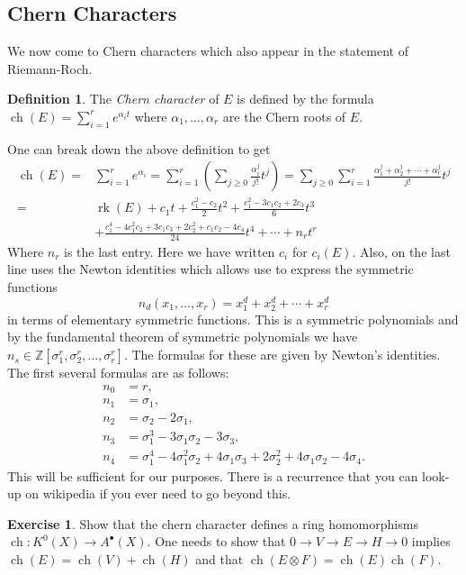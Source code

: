 \documentclass[12pt]{article}
\numberwithin{equation}{section}
\theoremstyle{definition}
\newtheorem{definition}[theorem]{Definition}
\newtheorem{exercise}[theorem]{Exercise}
\theoremstyle{remark}
\newcommand{\ZZ}{\mathbb{Z}}
\newcommand{\rk}{\operatorname{rk}}
\newcommand{\ch}{\operatorname{ch}}
\begin{document}
\subsection{Chern Characters}
We now come to Chern characters which also appear in the statement of Riemann-Roch.
\begin{definition}
	The \emph{Chern character} of $E$ is defined by the formula $\ch(E) = \sum_{i=1}^r e^{\alpha_i t}$
	where $\alpha_1,\ldots, \alpha_r$ are the Chern roots of $E$.
\end{definition}
One can break down the above definition to get 
\begin{align*}
\ch(E) =&\sum_{i=1}^r e^{\alpha_i}=\sum_{i=1}^r \left ( \sum_{j\geq 0}  \frac{\alpha_i^j}{j!}t^j \right) = \sum_{j\geq 0}  \sum_{i=1}^r \frac{\alpha_1^j + \alpha_2^j + \cdots + \alpha_r^j }{j!}t^j\\
=& \rk(E) + c_1t + \frac{c_1^2 - c_2 }{2}t^2 + \frac{c_1^2 - 3 c_1 c_2 + 2c_3}{6}t^3 \\
& + \frac{c_1^4 - 4c_1^2c_2 + 3 c_1c_3 + 2 c_2^2 + c_1c_2 - 4c_4}{24} t^4 + \cdots + n_r t^r
\end{align*}
Where $n_r$ is the last entry. 
Here we have written $c_i$ for $c_i(E)$. 
Also, on the last line uses the Newton identities which allows use to express the symmetric functions 
$$n_d(x_1,\ldots,x_r) = x_1^d+x_2^d+\cdots + x_r^d $$
in terms of elementary symmetric functions.
This is a symmetric polynomials and by the fundamental theorem of symmetric polynomials we have $n_s \in \ZZ[\sigma^r_1,\sigma^r_2,\ldots,\sigma^r_r]$.
The formulas for these are given by Newton's identities. 
The first several formulas are as follows:
\begin{align*}
n_0 &= r, \\
n_1 &= \sigma_1, \\
n_2 &= \sigma_2 - 2 \sigma_1,\\
n_3 &= \sigma_1^3 - 3 \sigma_1 \sigma_2 - 3 \sigma_3,\\
n_4 &= \sigma_1^4 - 4 \sigma_1^2 \sigma_2 + 4 \sigma_1 \sigma_3 + 2 \sigma_2^2 + 4\sigma_1 \sigma_2 - 4 \sigma_4.
\end{align*}
This will be sufficient for our purposes.
There is a recurrence that you can look-up on wikipedia if you ever need to go beyond this. 
\begin{exercise}
	Show that the chern character defines a ring homomorphisms $\ch: K^0(X) \to A^{\bullet}(X).$ One needs to show that $ 0 \to V \to E \to H \to 0$ implies $\ch(E) = \ch(V) + \ch(H)$ and that $ \ch(E \otimes F) = \ch(E)\ch(F)$.
\end{exercise}
\end{document}
